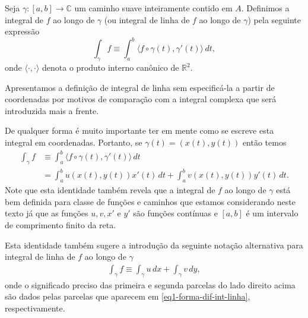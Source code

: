\begin{definicao}
\label{def-int-linha-R2}
Seja $\gamma:[a,b]\to\mathbb{C}$ um caminho suave inteiramente contido em $A$. 
Definimos a integral de $f$ ao longo de $\gamma$
(ou integral de linha de $f$ ao longo de $\gamma$) pela seguinte expressão
\[
\int_{\gamma} f 
\equiv
\int_{a}^{b} \langle f\circ\gamma(t),\gamma'(t) \rangle \, dt,
\]
onde $\langle\cdot,\cdot\rangle$ denota o produto interno canônico de $\mathbb{R}^2$.
\end{definicao}

Apresentamos a definição de integral de linha sem especificá-la a partir de coordenadas
por motivos de comparação com a integral complexa que será introduzida mais a frente.

De qualquer forma é muito importante ter em mente como se escreve esta integral em coordenadas.
Portanto, se $\gamma(t)=(x(t),y(t))$ então temos  
\begin{align}\label{eq1-forma-dif-int-linha}
\int_{\gamma} f 
&\equiv
\int_{a}^{b} \langle f\circ\gamma(t),\gamma'(t) \rangle \, dt
\nonumber \\
&=
\int_{a}^{b} u(x(t),y(t))x'(t) \, dt + \int_{a}^{b} v(x(t),y(t))y'(t) \, dt.
\end{align}
Note que esta identidade também revela que a integral de $f$ ao longo de $\gamma$ está bem definida
para classe de funções e caminhos que estamos considerando neste texto já que 
as funções $u,v,x'$ e $y'$ são funções contínuas
e $[a,b]$ é um intervalo de comprimento finito da reta.


Esta identidade também sugere a introdução da seguinte notação alternativa para integral 
de linha de $f$ ao longo de $\gamma$
\begin{align}\label{eq2-forma-dif-int-linha}
\int_{\gamma} f
\equiv 
\int_{\gamma} u\, dx + \int_{\gamma} v \, dy,
\end{align}
onde o significado preciso das primeira e segunda parcelas do lado direito acima 
são dados pelas parcelas que aparecem em \eqref{eq1-forma-dif-int-linha},
respectivamente.

%


